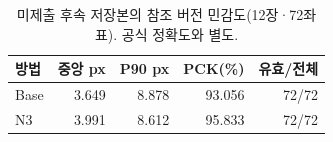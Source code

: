 \begin{table}[t]\centering\footnotesize
\caption{미제출 후속 저장본의 참조 버전 민감도(12장·72좌표). 공식 정확도와 별도.}\label{sup:reference_version_sensitivity}
\begin{tabularx}{\columnwidth}{Yrrrr}\toprule
방법 & 중앙 px & P90 px & PCK(\%) & 유효/전체 \\\midrule
Base & 3.649 & 8.878 & 93.056 & 72/72 \\
N3 & 3.991 & 8.612 & 95.833 & 72/72 \\
\bottomrule\end{tabularx}
\end{table}
